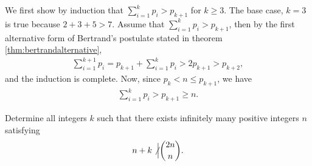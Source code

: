 \documentclass{subfile}
\begin{document}
	\begin{solution}
		We first show by induction that $\sum_{i=1}^{k} p_i > p_{k+1}$ for $k \geq 3$. The base case, $k=3$ is true because $2+3+5>7$. Assume that $\sum_{i=1}^{k} p_i > p_{k+1}$, then by the first alternative form of Bertrand's postulate stated in theorem \eqref{thm:bertrandalternative},
			\begin{align*}
				\sum_{i=1}^{k+1} p_i = p_{k+1} + \sum_{i=1}^k p_i > 2p_{k+1} > p_{k+2},
			\end{align*}
		and the induction is complete. Now, since $p_k<n\leq p_{k+1}$, we have
			\begin{align*}
				\sum_{i=1}^k p_i > p_{k+1} \geq n.
			\end{align*}
	\end{solution}

	\begin{problem}[China 2015]\label{prob:china2015-bertrand}
		Determine all integers $k$ such that there exists infinitely many positive integers $n$ satisfying
		\begin{align*}
		n+k \not \Big| \binom{2n}{n}.
		\end{align*}
	\end{problem}
\end{document}
